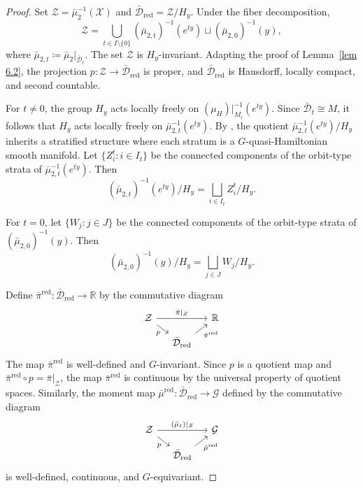 \documentclass[reqno]{amsart}
\theoremstyle{plain}
\theoremstyle{definition}
\begin{document}
\begin{proof}
Set $\mathcal{Z} = \bar{\mu}_2^{-1}(\mathcal{X})$ and $\bar{\mathcal{D}}_{\mathrm{red}} = \mathcal{Z}/H_y$. Under the fiber decomposition,
\[
\mathcal{Z} = \bigcup_{t \in I \setminus \{0\}} (\bar{\mu}_{2,t})^{-1}(e^{ty}) \sqcup (\bar{\mu}_{2,0})^{-1}(y),
\]
where $\bar{\mu}_{2,t} \coloneqq \bar{\mu}_2|_{\bar{\mathcal{D}}_t}$. The set $\mathcal{Z}$ is $H_y$-invariant. Adapting the proof of Lemma~\ref{lem 6.2}, the projection $p: \mathcal{Z} \to \bar{\mathcal{D}}_{\mathrm{red}}$ is proper, and $\bar{\mathcal{D}}_{\mathrm{red}}$ is Hausdorff, locally compact, and second countable.

For $t \neq 0$, the group $H_y$ acts locally freely on $(\mu_H)|_{M_i}^{-1}(e^{ty})$. Since $\bar{\mathcal{D}}_t \cong M$, it follows that $H_y$ acts locally freely on $\bar{\mu}_{2,t}^{-1}(e^{ty})$. By \cite[Theorem~2.9]{hurtubise2006group}, the quotient $\bar{\mu}_{2,t}^{-1}(e^{ty})/H_y$ inherits a stratified structure where each stratum is a $G$-quasi-Hamiltonian smooth manifold. Let $\{Z^t_i : i \in I_t\}$ be the connected components of the orbit-type strata of $\bar{\mu}_{2,t}^{-1}(e^{ty})$. Then
\[
(\bar{\mu}_{2,t})^{-1}(e^{ty})/H_y = \bigsqcup_{i \in I_t} Z^t_i/H_y.
\]

For $t = 0$, let $\{W_j : j \in J\}$ be the connected components of the orbit-type strata of $(\bar{\mu}_{2,0})^{-1}(y)$. Then
\[
(\bar{\mu}_{2,0})^{-1}(y)/H_y = \bigsqcup_{j \in J} W_j/H_y.
\]

Define $\bar{\pi}^{\mathrm{red}}: \bar{\mathcal{D}}_{\mathrm{red}} \to \mathbb{R}$ by the commutative diagram
\[
\begin{tikzcd}[sep=small]
\mathcal{Z} \arrow[rr, "{\bar{\pi}|_{\mathcal{Z}}}"] \arrow[dr, "p"'] & & \mathbb{R} \\
& \bar{\mathcal{D}}_{\mathrm{red}} \arrow[ur, "{\bar{\pi}^{\mathrm{red}}}"']
\end{tikzcd}
\]
The map $\bar{\pi}^{\mathrm{red}}$ is well-defined and $G$-invariant. Since $p$ is a quotient map and $\bar{\pi}^{\mathrm{red}} \circ p = \bar{\pi}|_{\mathcal{Z}}$, the map $\bar{\pi}^{\mathrm{red}}$ is continuous by the universal property of quotient spaces. Similarly, the moment map $\bar{\mu}^{\mathrm{red}}: \bar{\mathcal{D}}_{\mathrm{red}} \to \mathcal{G}$ defined by the commutative diagram
\[
\begin{tikzcd}[sep=small]
\mathcal{Z} \arrow[rr, "{(\bar{\mu}_1)|_{\mathcal{Z}}}"] \arrow[dr, "p"'] & & \mathcal{G} \\
& \bar{\mathcal{D}}_{\mathrm{red}} \arrow[ur, "{\bar{\mu}^{\mathrm{red}}}"']
\end{tikzcd}
\]
is well-defined, continuous, and $G$-equivariant.


\end{proof}
\end{document}
